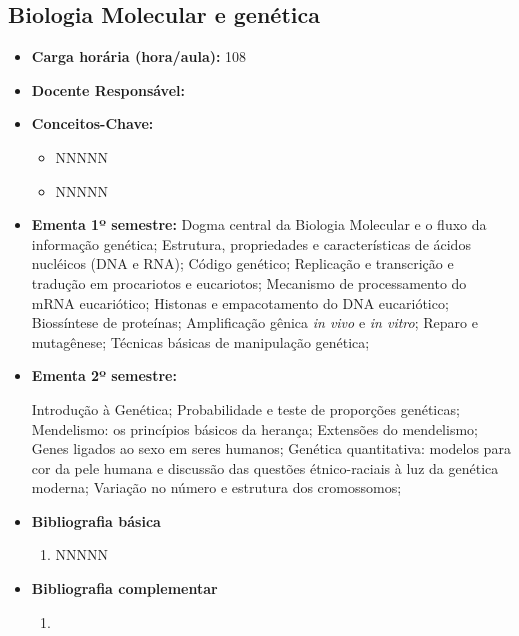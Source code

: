 \documentclass[11pt,fleqn]{book} %
\begin{document}
\subsection{Biologia Molecular e genética}\label{disc:biomol}
\begin{itemize}
	\item \textbf{Carga horária (hora/aula):} 108
	\item \textbf{Docente Responsável:}
	\item \textbf{Conceitos-Chave:}
	\begin{itemize}
		\item NNNNN
		\item NNNNN
	\end{itemize}
	\item \textbf{Ementa 1º semestre:}
	Dogma central da Biologia Molecular e o fluxo da informação genética;
	Estrutura, propriedades e características de ácidos nucléicos (DNA e RNA);
	Código genético; 
	Replicação e transcrição e tradução em procariotos e eucariotos;
	Mecanismo de processamento do mRNA eucariótico; 
	Histonas e empacotamento do DNA eucariótico; 
	Biossíntese de proteínas; 
	Amplificação gênica \textit{in vivo} e \textit{in vitro}; 
	Reparo e mutagênese;
	Técnicas básicas de manipulação genética;
	
	\item \textbf{Ementa 2º semestre:}	
	
	Introdução à Genética;
	Probabilidade e teste de proporções genéticas; 
	Mendelismo: os princípios básicos da herança; 
	Extensões do mendelismo; 
	Genes ligados ao sexo em seres humanos;
	Genética quantitativa: modelos para cor da pele humana e discussão das questões étnico-raciais à luz da genética moderna;
	Variação no número e estrutura dos cromossomos;
	
	\item \textbf{Bibliografia básica}
	\begin{enumerate}
		\item NNNNN
	\end{enumerate}
	\item \textbf{Bibliografia complementar}
	\begin{enumerate}
		\item 
	\end{enumerate}	
\end{itemize}

\newpage
\end{document}
